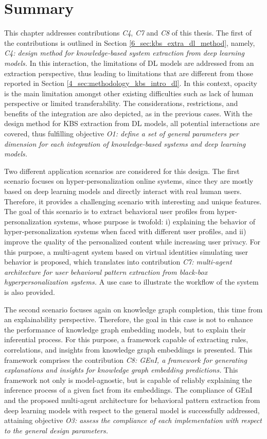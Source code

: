 \section{Summary}\label{6_sec:summary}
This chapter addresses contributions \textit{C4}, \textit{C7} and \textit{C8} of this thesis. The first of the contributions is outlined in Section \ref{6_sec:kbs_extra_dl_method}, namely, \textit{C4: design method for knowledge-based system extraction from deep learning models.} In this interaction, the limitations of DL models are addressed from an extraction perspective, thus leading to limitations that are different from those reported in Section \ref{4_sec:methodology_kbs_intro_dl}. In this context, opacity is the main limitation amongst other existing difficulties such as lack of human perspective or limited transferability. The considerations, restrictions, and benefits of the integration are also depicted, as in the previous cases. With the design method for KBS extraction from DL models, all potential interactions are covered, thus fulfilling objective \textit{O1: define a set of general parameters per dimension for each integration of knowledge-based systems and deep learning models.}

Two different application scenarios are considered for this design. The first scenario focuses on hyper-personalization online systems, since they are mostly based on deep learning models and directly interact with real human users. Therefore, it provides a challenging scenario with interesting and unique features. The goal of this scenario is to extract behavioral user profiles from hyper-personalization systems, whose purpose is twofold: i) explaining the behavior of hyper-personalization systems when faced with different user profiles, and ii) improve the quality of the personalized content while increasing user privacy. For this purpose, a multi-agent system based on virtual identities simulating user behavior is proposed, which translates into contribution \textit{C7: multi-agent architecture for user behavioral pattern extraction from black-box hyperpersonalization systems.} A use case to illustrate the workflow of the system is also provided.

The second scenario focuses again on knowledge graph completion, this time from an explainability perspective. Therefore, the goal in this case is not to enhance the performance of knowledge graph embedding models, but to explain their inferential process. For this purpose, a framework capable of extracting rules, correlations, and insights from knowledge graph embeddings is presented. This framework comprises the contribution \textit{C8: GEnI, a framework for generating explanations and insights for knowledge graph embedding predictions.} This framework not only is model-agnostic, but is capable of reliably explaining the inference process of a given fact from its embeddings. The compliance of GEnI and the proposed multi-agent architecture for behavioral pattern extraction from deep learning models with respect to the general model is successfully addressed, attaining objective \textit{O3: assess the compliance of each implementation with respect to the general design parameters.}  

